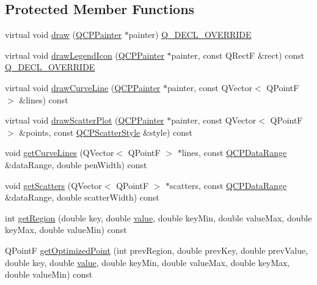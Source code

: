 \subsection*{Protected Member Functions}
\begin{DoxyCompactItemize}
\item 
virtual void \mbox{\hyperlink{class_q_c_p_curve_ac199d41d23865cd68bd7b598308a4433}{draw}} (\mbox{\hyperlink{class_q_c_p_painter}{Q\+C\+P\+Painter}} $\ast$painter) \mbox{\hyperlink{qcustomplot_8h_a42cc5eaeb25b85f8b52d2a4b94c56f55}{Q\+\_\+\+D\+E\+C\+L\+\_\+\+O\+V\+E\+R\+R\+I\+DE}}
\item 
virtual void \mbox{\hyperlink{class_q_c_p_curve_aac6e94afbce4002d2cd7793250154e84}{draw\+Legend\+Icon}} (\mbox{\hyperlink{class_q_c_p_painter}{Q\+C\+P\+Painter}} $\ast$painter, const Q\+RectF \&rect) const \mbox{\hyperlink{qcustomplot_8h_a42cc5eaeb25b85f8b52d2a4b94c56f55}{Q\+\_\+\+D\+E\+C\+L\+\_\+\+O\+V\+E\+R\+R\+I\+DE}}
\item 
virtual void \mbox{\hyperlink{class_q_c_p_curve_aa4d7415f7c69eb7820263941f7d88e2c}{draw\+Curve\+Line}} (\mbox{\hyperlink{class_q_c_p_painter}{Q\+C\+P\+Painter}} $\ast$painter, const Q\+Vector$<$ Q\+PointF $>$ \&lines) const
\item 
virtual void \mbox{\hyperlink{class_q_c_p_curve_a0bea811373c5ee8c67c9c2b4d74ad866}{draw\+Scatter\+Plot}} (\mbox{\hyperlink{class_q_c_p_painter}{Q\+C\+P\+Painter}} $\ast$painter, const Q\+Vector$<$ Q\+PointF $>$ \&points, const \mbox{\hyperlink{class_q_c_p_scatter_style}{Q\+C\+P\+Scatter\+Style}} \&style) const
\item 
void \mbox{\hyperlink{class_q_c_p_curve_aefca1e5127fae2d7ff65b9e921637c58}{get\+Curve\+Lines}} (Q\+Vector$<$ Q\+PointF $>$ $\ast$lines, const \mbox{\hyperlink{class_q_c_p_data_range}{Q\+C\+P\+Data\+Range}} \&data\+Range, double pen\+Width) const
\item 
void \mbox{\hyperlink{class_q_c_p_curve_a564c5fdc8409e3532b1322389a8434b8}{get\+Scatters}} (Q\+Vector$<$ Q\+PointF $>$ $\ast$scatters, const \mbox{\hyperlink{class_q_c_p_data_range}{Q\+C\+P\+Data\+Range}} \&data\+Range, double scatter\+Width) const
\item 
int \mbox{\hyperlink{class_q_c_p_curve_a77c89253397c4754b40d4bc8d3e789bf}{get\+Region}} (double key, double \mbox{\hyperlink{diffusion_8cpp_a4b41795815d9f3d03abfc739e666d5da}{value}}, double key\+Min, double value\+Max, double key\+Max, double value\+Min) const
\item 
Q\+PointF \mbox{\hyperlink{class_q_c_p_curve_a1d4530a81f718a2085df03d6a059d5d8}{get\+Optimized\+Point}} (int prev\+Region, double prev\+Key, double prev\+Value, double key, double \mbox{\hyperlink{diffusion_8cpp_a4b41795815d9f3d03abfc739e666d5da}{value}}, double key\+Min, double value\+Max, double key\+Max, double value\+Min) const

\end{DoxyCompactItemize}
